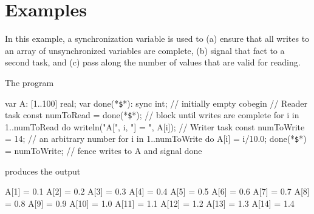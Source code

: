 
\section{Examples}
\label{MCM_examples}
\begin{example}
  In this example, a synchronization variable is used to (a) ensure that
  all writes to an array of unsynchronized variables are complete, (b)
  signal that fact to a second task, and (c) pass along the number of
  values that are valid for reading.

  The program
\begin{chapel}
var A: [1..100] real;
var done(*\texttt{\$}*): sync int;           // initially empty
cobegin {
  { // Reader task
    const numToRead = done(*\texttt{\$}*);   // block until writes are complete
    for i in 1..numToRead do
      writeln("A[", i, "] = ", A[i]);
  }
  {  // Writer task
    const numToWrite = 14;     // an arbitrary number
    for i in 1..numToWrite do
      A[i] = i/10.0;
    done(*\texttt{\$}*) = numToWrite;        // fence writes to A and signal done
  }
}
\end{chapel}
  produces the output
\begin{chapelprintoutput}{}
A[1] = 0.1
A[2] = 0.2
A[3] = 0.3
A[4] = 0.4
A[5] = 0.5
A[6] = 0.6
A[7] = 0.7
A[8] = 0.8
A[9] = 0.9
A[10] = 1.0
A[11] = 1.1
A[12] = 1.2
A[13] = 1.3
A[14] = 1.4
\end{chapelprintoutput}
\end{example}



